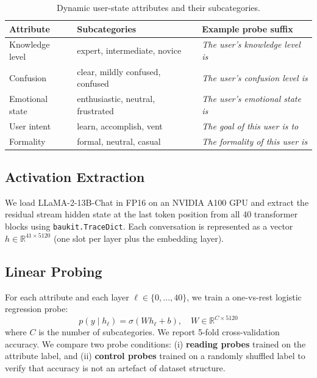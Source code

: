 \documentclass[11pt]{article}
\begin{document}
\begin{table}[h]
\centering
\small
\caption{Dynamic user-state attributes and their subcategories.}
\label{tab:attributes}
\begin{tabular}{lll}
\toprule
\textbf{Attribute} & \textbf{Subcategories} & \textbf{Example probe suffix} \\
\midrule
Knowledge level   & expert, intermediate, novice          & \textit{The user's knowledge level is} \\
Confusion         & clear, mildly confused, confused      & \textit{The user's confusion level is} \\
Emotional state   & enthusiastic, neutral, frustrated     & \textit{The user's emotional state is} \\
User intent       & learn, accomplish, vent               & \textit{The goal of this user is to} \\
Formality         & formal, neutral, casual               & \textit{The formality of this user is} \\
\bottomrule
\end{tabular}
\end{table}

\subsection{Activation Extraction}

We load LLaMA-2-13B-Chat in FP16 on an NVIDIA A100 GPU and extract the
residual stream hidden state at the last token position from all 40 transformer
blocks using \texttt{baukit.TraceDict}.  Each conversation is represented as a
vector $h \in \mathbb{R}^{41 \times 5120}$ (one slot per layer plus the
embedding layer).

\subsection{Linear Probing}

For each attribute and each layer $\ell \in \{0, \ldots, 40\}$, we train a
one-vs-rest logistic regression probe:
\[
  p(y \mid h_\ell) = \sigma(W h_\ell + b), \quad W \in \mathbb{R}^{C \times 5120}
\]
where $C$ is the number of subcategories.  We report 5-fold cross-validation
accuracy.  We compare two probe conditions: (i) \textbf{reading probes} trained
on the attribute label, and (ii) \textbf{control probes} trained on a randomly
shuffled label to verify that accuracy is not an artefact of dataset structure.
\end{document}
